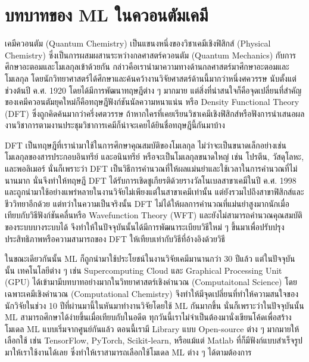 \section{บทบาทของ ML ในควอนตัมเคมี}

เคมีควอนตัม (Quantum Chemistry) เป็นแขนงหนึ่งของวิชาเคมีเชิงฟิสิกส์ (Physical Chemistry) ซึ่งเป็นการผสมผสานระหว่างกลศาสตร์ควอนตัม 
(Quantum Mechanics) กับการศึกษาอะตอมและโมเลกุลเข้าด้วยกัน กล่าวคือเรานำมาความทางด้านกลศาสตร์มาศึกษาอะตอมและโมเลกุล
โดยนักวิทยาศาสตร์ได้ศึกษาและค้นคว้างานวิจัยศาสตร์ด้านนี้มากว่าหนึ่งศควรรษ นับตั้งแต่ช่วงต้นปี ค.ศ. 1920 โดยได้มีการพัฒนาทฤษฎีต่าง ๆ มากมาย 
แต่สิ่งที่น่าสนใจก็คือจุดเปลี่ยนที่สำคัญของเคมีควอนตัมยุคใหม่ก็คือทฤษฎีฟังก์ชันนัลความหนาแน่น หรือ Density Functional Theory (DFT) 
ซึ่งถูกคิดค้นมากว่าครึ่งศตวรรษ ถ้าหากใครที่เคยเรียนวิชาเคมีเชิงฟิสิกส์หรือฟังการนำเสนอผลงานวิชาการตามงานประชุมวิชาการเคมีก็น่าจะเคยได้ยินชื่อทฤษฎีนี้กันมาบ้าง 

DFT เป็นทฤษฎีที่เรานำมาใช้ในการศึกษาคุณสมบัติของโมเลกุล ไม่ว่าจะเป็นขนาดเล็กอย่างเช่นโมเลกุลของสารประกอบอินทรีย์ และอนินทรีย์ 
หรือจะเป็นโมเลกุลขนาดใหญ่ เช่น โปรตีน, วัสดุโลหะ, และพอลิเมอร์ นั่นก็เพราะว่า DFT เป็นวิธีการคำนวณที่ให้ผลแม่นยำและใช้เวลาในการคำนวณที่ไม่นานมาก
นั่นจึงทำให้ทฤษฎี DFT ได้รับการเชิดชูเกียรติด้วยรางวัลโนเบลสาขาเคมีในปี ค.ศ. 1998 และถูกนำมาใช้อย่างแพร่หลายในงานวิจัยไม่เพียงแต่ในสาขาเคมีเท่านั้น 
แต่ยังรวมไปถึงสาขาฟิสิกส์และชีววิทยาอีกด้วย แต่ทว่าในความเป็นจริงนั้น DFT ไม่ได้ให้ผลการคำนวณที่แม่นยำสูงมากนักเมื่อเทียบกับวิธีฟังก์ชันคลื่นหรือ
Wavefunction Theory (WFT) และยังไม่สามารถคำนวณคุณสมบัติของระบบบางระบบได้ จึงทำให้ในปัจจุบันนั้นได้มีการพัฒนาระเบียบวิธีใหม่ ๆ 
ขึ้นมาเพื่อปรับปรุงประสิทธิภาพหรือความสามารถของ DFT ให้เทียบเท่ากับวิธีที่อ้างอิงด้วยวิธี

ในขณะเดียวกันนั้น ML ก็ถูกนำมาใช้ประโยชน์ในงานวิจัยเคมีมานานกว่า 30 ปีแล้ว แต่ในปัจจุบันนั้น เทคโนโลยีต่าง ๆ เช่น Supercomputing Cloud และ 
Graphical Processing Unit (GPU) ได้เข้ามามีบทบาทอย่างมากในวิทยาศาสตร์เชิงคำนวณ (Computaitonal Science) โดยเฉพาะเคมีเชิงคำนวณ 
(Computational Chemistry) จึงทำให้มีจุดเปลี่ยนที่ทำให้ความสนใจของนักวิจัยในช่วง 10 ปีที่ผ่านมานี้ในหันมาทำงานวิจัยโดยใช้ ML กันมากขึ้น 
นั่นก็เพราะว่าในปัจจุบันนั้น ML สามารถศึกษาได้ง่ายขึ้นเมื่อเทียบกับในอดีต ทุกวันนี้เราไม่จำเป็นต้องมานั่งเขียนโค้ดเพื่อสร้างโมเดล ML แบบเริ่มจากศูนย์กันแล้ว 
ตอนนี้เรามี Library แบบ Open-source ต่าง ๆ มากมายให้เลือกใช้ เช่น TensorFlow, PyTorch, Scikit-learn, หรือแม้แต่ Matlab 
ที่ก็มีฟังก์แบบสำเร็จรูปมาให้เราใช้งานได้เลย ซึ่งทำให้เราสามารถเลือกใช้โมเดล ML ต่าง ๆ ได้ตามต้องการ

